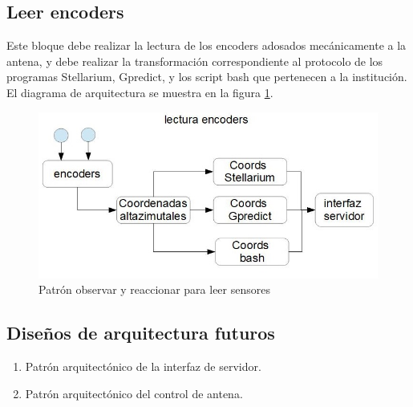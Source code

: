 \documentclass[12pt,a4paper, twosite]{article}
\begin{document}
	\subsection{Leer encoders}
	\label{sec:org5ca5790}
	Este bloque debe realizar la lectura de los encoders adosados mecánicamente a la antena, y debe realizar la transformación correspondiente al protocolo de los programas Stellarium, Gpredict, y los script bash que pertenecen a la institución. El diagrama de arquitectura se muestra en la figura \ref{fig:lectenc}.
	\begin{figure}[h!]
	\includegraphics{lectenc.jpg} 
	\caption{Patrón observar y reaccionar para leer sensores} 
	\label{fig:lectenc}
\end{figure}
	
	\subsection{Diseños de arquitectura futuros}
	\label{sec:org33cfcdb}
\begin{enumerate}
\item Patrón arquitectónico de la interfaz de servidor. 
\item Patrón arquitectónico del control de antena. 

\end{enumerate}		
	
	
\end{document}

